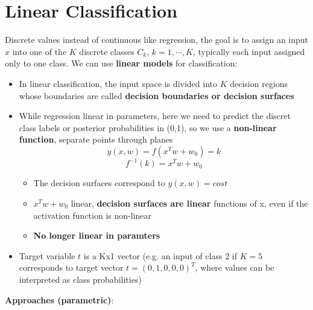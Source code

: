 
\section{Linear Classification}
    Discrete values instead of continuous like regression, the goal is to assign an input $x$ into one of the $K$ discrete classes $C_k,\,k=1,\cdots,K$, typically each input assigned only to one class. We can use \textbf{linear models} for classification:
    \begin{itemize}
        \item In linear classification, the input space is divided into $K$ decision regions whose boundaries are called \textbf{decision boundaries or decision surfaces}
        \item While regression linear in parameters, here we need to predict the discret class labels or posterior probabilities in (0,1), so we use a \textbf{non-linear function}, separate points through planes
        $$y(x,w)=f(x^Tw+w_0)=k$$
        $$f^{-1}(k)=x^Tw+w_0$$
        \begin{itemize}
            \item The decision surfaces correspond to $y(x,w)=cost$
            \item $x^Tw+w_0$ linear, \textbf{decision surfaces are linear} functions of x, even if the activation function is non-linear
            \item \textbf{No longer linear in paramters}
        \end{itemize}
        \item Target variable $t$ is a Kx1 vector (e.g. an input of class 2 if $K=5$ corresponds to target vector $t=(0,1,0,0,0)^T$, where values can be interpreted as class probabilities)
    \end{itemize}
    \textbf{Approaches (parametric)}:
